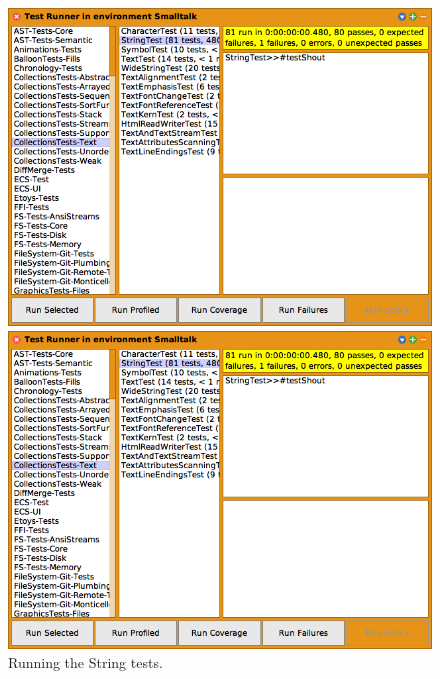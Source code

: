 \documentclass[a4paper,10pt,twoside]{book}
\begin{document}

\begin{figure}[hbt]
\ifluluelse
	{\centerline {\includegraphics[width=\textwidth]{testRunnerOnStringTest}}}
	{\centerline {\includegraphics[scale=0.5]{testRunnerOnStringTest}}}
\caption{Running the String tests.
\label{fig:testRunnerTestShout}}
\end{figure}
\end{document}

